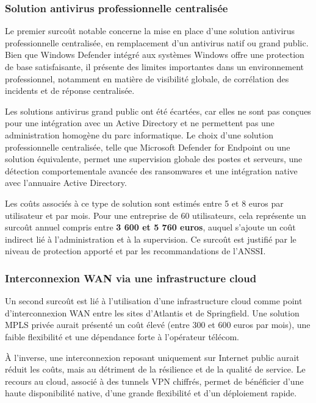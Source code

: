 \subsubsection*{Solution antivirus professionnelle centralisée}

Le premier surcoût notable concerne la mise en place d’une solution antivirus professionnelle centralisée, en remplacement d’un antivirus natif ou grand public. Bien que Windows Defender intégré aux systèmes Windows offre une protection de base satisfaisante, il présente des limites importantes dans un environnement professionnel, notamment en matière de visibilité globale, de corrélation des incidents et de réponse centralisée.

\noindent Les solutions antivirus grand public ont été écartées, car elles ne sont pas conçues pour une intégration avec un Active Directory et ne permettent pas une administration homogène du parc informatique. Le choix d’une solution professionnelle centralisée, telle que Microsoft Defender for Endpoint ou une solution équivalente, permet une supervision globale des postes et serveurs, une détection comportementale avancée des ransomwares et une intégration native avec l’annuaire Active Directory.

\noindent Les coûts associés à ce type de solution sont estimés entre 5 et 8 euros par utilisateur et par mois. Pour une entreprise de 60 utilisateurs, cela représente un surcoût annuel compris entre \textbf{3 600 et 5 760 euros}, auquel s’ajoute un coût indirect lié à l’administration et à la supervision. Ce surcoût est justifié par le niveau de protection apporté et par les recommandations de l’ANSSI.

\subsubsection*{Interconnexion WAN via une infrastructure cloud}

Un second surcoût est lié à l’utilisation d’une infrastructure cloud comme point d’interconnexion WAN entre les sites d’Atlantis et de Springfield. Une solution MPLS privée aurait présenté un coût élevé (entre 300 et 600 euros par mois), une faible flexibilité et une dépendance forte à l’opérateur télécom.

\noindent À l’inverse, une interconnexion reposant uniquement sur Internet public aurait réduit les coûts, mais au détriment de la résilience et de la qualité de service. Le recours au cloud, associé à des tunnels VPN chiffrés, permet de bénéficier d’une haute disponibilité native, d’une grande flexibilité et d’un déploiement rapide.

